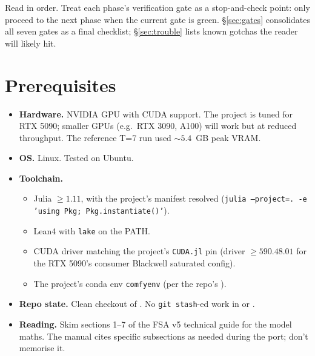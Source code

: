 \documentclass[11pt,a4paper]{article}
\begin{document}
Read in order. Treat each phase's verification gate as a stop-and-check
point: only proceed to the next phase when the current gate is
green. \S\ref{sec:gates} consolidates all seven gates as a final
checklist; \S\ref{sec:trouble} lists known gotchas the reader will
likely hit.


\section{Prerequisites}
\label{sec:prereqs}

\begin{itemize}[itemsep=2pt]
  \item \textbf{Hardware.} NVIDIA GPU with CUDA support. The project
        is tuned for RTX 5090; smaller GPUs (e.g.\ RTX 3090, A100)
        will work but at reduced throughput. The reference T=7 run
        used $\sim 5.4$~GB peak VRAM.
  \item \textbf{OS.} Linux. Tested on Ubuntu.
  \item \textbf{Toolchain.}
        \begin{itemize}[itemsep=0pt]
          \item Julia $\ge 1.11$, with the project's manifest
                resolved (\texttt{julia --project=. -e 'using Pkg; Pkg.instantiate()'}).
          \item Lean4 with \texttt{lake} on the PATH.
          \item CUDA driver matching the project's \texttt{CUDA.jl}
                pin (driver $\ge 590.48.01$ for the RTX 5090's
                consumer Blackwell saturated config).
          \item The project's conda env \texttt{comfyenv}
                (per the repo's ).
        \end{itemize}
  \item \textbf{Repo state.} Clean checkout of
        . No
        \texttt{git stash}-ed work in 
        or .
  \item \textbf{Reading.} Skim sections 1--7 of the FSA v5
        technical guide for the model maths. The manual cites
        specific subsections as needed during the port; don't
        memorise it.
\end{itemize}
\end{document}
